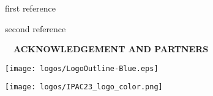 \documentclass[
portrait,
a0paper%
]
{baposter}
\begin{document}
\begin{poster}
{\begin{minipage}[t][3.6cm]{.32\textwidth}
\begin{thebibliography}{9}
\begin{tiny}
                    first reference
                    \vspace{-0.1cm}

                    second reference
                    \vspace{-0.1cm}

                \end{tiny}
        \end{thebibliography}
    \end{minipage}
    \hfill\vline\hfill
    \begin{minipage}[t][3.6cm]{.32\textwidth}
        \vspace{.3cm}
        $\quad$\textbf{\small\color{cernblue}ACKNOWLEDGEMENT AND PARTNERS}\\$\;$\\
        \footnotesize
        \begin{minipage}{.32\textwidth}
            \begin{center}
                \texttt{[image: logos/LogoOutline-Blue.eps]}
            \end{center}
        \end{minipage}
        \begin{minipage}{.32\textwidth}
            \begin{center}
                \texttt{[image: logos/IPAC23\_logo\_color.png]}
            \end{center}
        \end{minipage}
        \begin{minipage}{.32\textwidth}
            \begin{center}
            \end{center}
        \end{minipage}
        \vspace*{-0.5cm}
        \begin{minipage}{.1\textwidth}
            \hspace{\textwidth}
        \end{minipage}
        \begin{minipage}{.33\textwidth}
            \begin{center}
            \end{center}

\end{minipage}
\end{minipage}}
\end{poster}
\end{document}
